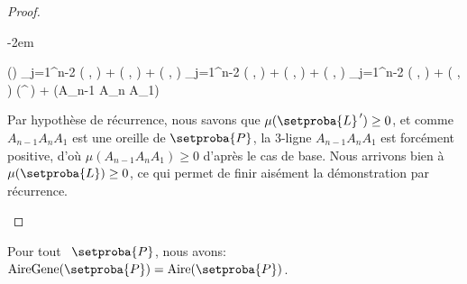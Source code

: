 \begin{proof}
\begin{itemize}
		\leavevmode\kern-2em%
		\begin{stepcalc}[style=ar*]
			\mu()
		\explnext{}
			\dsum_{j=1}^{n-2} \det \big(  ,   \big)
			+
			\det \big(  ,   \big)
			+
			\det \big(  ,   \big)
		          {}
			\dsum_{j=1}^{n-2} \det \big(  ,   \big)
			+
			\det \big(  ,   \big)
			+
			\det \big(  ,   \big)
		\explnext{}
			\dsum_{j=1}^{n-2} \det \big(  ,   \big)
			+
			\det \big(  ,   \big)
		\explnext{}
			\mu(^{\,\prime})
			+
			\mu(A_{n-1} A_n A_1)
		\end{stepcalc}


		\noindent
		Par hypothèse de récurrence, nous savons que
		$\mu(\setproba{L}^{\,\prime}) \geq 0$,
		et comme $A_{n-1} A_n A_1$ est une oreille de $\setproba{P}$, la $3$-ligne $A_{n-1} A_n A_1$ est forcément positive, d'où $\mu(A_{n-1} A_n A_1) \geq 0$ d'après le cas de base.
		Nous arrivons bien à $\mu(\setproba{L}) \geq 0$, ce qui permet de finir aisément la démonstration par récurrence.
	\end{itemize}
\end{proof}




\begin{fact} \label{ngone-garea-is-area}
    Pour tout \ngone\ $\setproba{P}$, nous avons: $\garea{\setproba{P}} = \area{\setproba{P}}$.
\end{fact}


